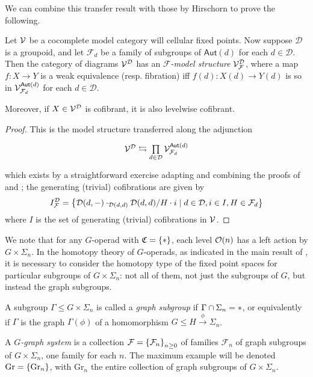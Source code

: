 \documentclass[a4paper,10pt
,draft
]{article}%
\renewcommand{\F}{\mathcal F}
\renewcommand{\1}{\eta}%
\begin{document}
We can combine this transfer result with those by Hirschorn to prove the following.
\begin{proposition}
      \label{TRANS_MODEL_PROP}
      Let $\mathcal V$ be a cocomplete model category will cellular fixed points.
      Now suppose $\mathcal D$ is a groupoid, and let $\F_d$ be a family of subgroups of $\mathsf{Aut}(d)$ for each $d \in \mathcal D$.
      Then the category of diagrams $\mathcal V^{\mathcal D}$ has an \textit{$\F$-model structure} $\V^\D_\F$, where
      a map $f: X \to Y$ is a
      weak equivalence (resp. fibration) iff $f(d): X(d) \to Y(d)$ is so in $\V^{\mathsf{Aut}(d)}_{\F_d}$ for each $d \in \mathcal D$.

      Moreover, if $X \in \mathcal V^{\mathcal D}$ is cofibrant, it is also levelwise cofibrant.
\end{proposition}
\begin{proof}
      This is the model structure transferred along the adjunction
      \begin{equation}
            \begin{tikzcd}
                  \V^\D \leftrightarrows
                  \mathop{\prod}\limits_{d \in \D}\V^{\mathsf{Aut}(d)}_{\F_d}
            \end{tikzcd}
      \end{equation}
      which exists by a straightforward exercise adapting and combining the proofs of
      \cite[Thm 11.6.1]{Hir03} and \cite[Prop 2.6]{Ste16};
      the generating (trivial) cofibrations are given by
      \begin{equation}
            I^{\mathcal D}_\F = \sets{\mathcal D(d,-) \cdot_{\mathcal D(d,d)} \mathcal D(d,d)/H \cdot i}{d \in \mathcal D, i \in I, H \in \F_d}
      \end{equation}
      where $I$ is the set of generating (trivial) cofibrations in $\mathcal V$.
\end{proof}

We note that for any $G$-operad with $\mathfrak C = \set{\**}$, each level $\mathcal{O}(n)$ has a left action by $G \times \Sigma_n$.
In the homotopy theory of $G$-operads, as indicated in the main result of \cite{BP_geo}, it is
necessary to consider the homotopy type of the fixed point spaces for particular subgroups of $G \times \Sigma_n$:
not all of them, not just the subgroups of $G$, but instead the graph subgroups.

\begin{definition}
      \label{GGRAPHFAM_DEF}
      A subgroup $\Gamma \leq G \times \Sigma_n$ is called a \textit{graph subgroup} if $\Gamma \cap \Sigma_n = \**$,
      or equivalently if $\Gamma$ is the graph $\Gamma(\phi)$ of a homomorphism $G \leq H \xrightarrow{\phi} \Sigma_n$.

      A \textit{$G$-graph system} is a collection $\F = \set{\F_n}_{n \geq 0}$ of families $\F_n$ of graph subgroups of $G \times \Sigma_n$, one family for each $n$.
      The maximum example will be denoted $\mathrm{Gr} = \left\{\mathrm{Gr}_n\right\}$, with $\mathrm{Gr}_n$ the entire collection of graph subgroups of $G \times \Sigma_n$.
\end{definition}
\end{document}
